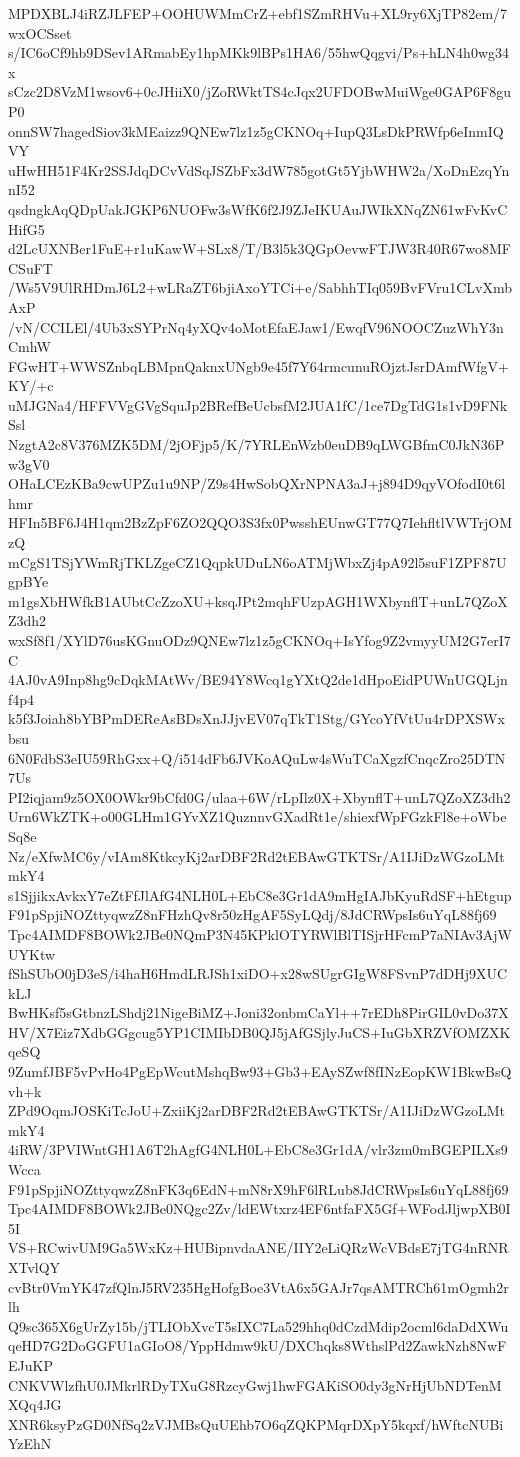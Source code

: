 MPDXBLJ4iRZJLFEP+OOHUWMmCrZ+ebf1SZmRHVu+XL9ry6XjTP82em/7wxOCSset
s/IC6oCf9hb9DSev1ARmabEy1hpMKk9lBPs1HA6/55hwQqgvi/Ps+hLN4h0wg34x
sCzc2D8VzM1wsov6+0cJHiiX0/jZoRWktTS4cJqx2UFDOBwMuiWge0GAP6F8guP0
onnSW7hagedSiov3kMEaizz9QNEw7lz1z5gCKNOq+IupQ3LsDkPRWfp6eInmIQVY
uHwHH51F4Kr2SSJdqDCvVdSqJSZbFx3dW785gotGt5YjbWHW2a/XoDnEzqYnnI52
qsdngkAqQDpUakJGKP6NUOFw3sWfK6f2J9ZJeIKUAuJWIkXNqZN61wFvKvCHifG5
d2LcUXNBer1FuE+r1uKawW+SLx8/T/B3l5k3QGpOevwFTJW3R40R67wo8MFCSuFT
/Ws5V9UlRHDmJ6L2+wLRaZT6bjiAxoYTCi+e/SabhhTIq059BvFVru1CLvXmbAxP
/vN/CCILEl/4Ub3xSYPrNq4yXQv4oMotEfaEJaw1/EwqfV96NOOCZuzWhY3nCmhW
FGwHT+WWSZnbqLBMpnQaknxUNgb9e45f7Y64rmcunuROjztJsrDAmfWfgV+KY/+c
uMJGNa4/HFFVVgGVgSquJp2BRefBeUcbsfM2JUA1fC/1ce7DgTdG1s1vD9FNkSsl
NzgtA2c8V376MZK5DM/2jOFjp5/K/7YRLEnWzb0euDB9qLWGBfmC0JkN36Pw3gV0
OHaLCEzKBa9cwUPZu1u9NP/Z9s4HwSobQXrNPNA3aJ+j894D9qyVOfodI0t6lhmr
HFIn5BF6J4H1qm2BzZpF6ZO2QQO3S3fx0PwsshEUnwGT77Q7IehfltlVWTrjOMzQ
mCgS1TSjYWmRjTKLZgeCZ1QqpkUDuLN6oATMjWbxZj4pA92l5suF1ZPF87UgpBYe
m1gsXbHWfkB1AUbtCcZzoXU+ksqJPt2mqhFUzpAGH1WXbynflT+unL7QZoXZ3dh2
wxSf8f1/XYlD76usKGnuODz9QNEw7lz1z5gCKNOq+IsYfog9Z2vmyyUM2G7erI7C
4AJ0vA9Inp8hg9cDqkMAtWv/BE94Y8Wcq1gYXtQ2de1dHpoEidPUWnUGQLjnf4p4
k5f3Joiah8bYBPmDEReAsBDsXnJJjvEV07qTkT1Stg/GYcoYfVtUu4rDPXSWxbsu
6N0FdbS3eIU59RhGxx+Q/i514dFb6JVKoAQuLw4sWuTCaXgzfCnqcZro25DTN7Us
PI2iqjam9z5OX0OWkr9bCfd0G/ulaa+6W/rLpIlz0X+XbynflT+unL7QZoXZ3dh2
Urn6WkZTK+o00GLHm1GYvXZ1QuznnvGXadRt1e/shiexfWpFGzkFl8e+oWbeSq8e
Nz/eXfwMC6y/vIAm8KtkcyKj2arDBF2Rd2tEBAwGTKTSr/A1IJiDzWGzoLMtmkY4
s1SjjikxAvkxY7eZtFfJlAfG4NLH0L+EbC8e3Gr1dA9mHgIAJbKyuRdSF+hEtgup
F91pSpjiNOZttyqwzZ8nFHzhQv8r50zHgAF5SyLQdj/8JdCRWpsIs6uYqL88fj69
Tpc4AIMDF8BOWk2JBe0NQmP3N45KPklOTYRWlBlTISjrHFcmP7aNIAv3AjWUYKtw
fShSUbO0jD3eS/i4haH6HmdLRJSh1xiDO+x28wSUgrGIgW8FSvnP7dDHj9XUCkLJ
BwHKsf5sGtbnzLShdj21NigeBiMZ+Joni32onbmCaYl++7rEDh8PirGIL0vDo37X
HV/X7Eiz7XdbGGgcug5YP1CIMIbDB0QJ5jAfGSjlyJuCS+IuGbXRZVfOMZXKqeSQ
9ZumfJBF5vPvHo4PgEpWcutMshqBw93+Gb3+EAySZwf8fINzEopKW1BkwBsQvh+k
ZPd9OqmJOSKiTcJoU+ZxiiKj2arDBF2Rd2tEBAwGTKTSr/A1IJiDzWGzoLMtmkY4
4iRW/3PVIWntGH1A6T2hAgfG4NLH0L+EbC8e3Gr1dA/vlr3zm0mBGEPILXs9Wcca
F91pSpjiNOZttyqwzZ8nFK3q6EdN+mN8rX9hF6lRLub8JdCRWpsIs6uYqL88fj69
Tpc4AIMDF8BOWk2JBe0NQgc2Zv/ldEWtxrz4EF6ntfaFX5Gf+WFodJljwpXB0I5I
VS+RCwivUM9Ga5WxKz+HUBipnvdaANE/IIY2eLiQRzWcVBdsE7jTG4nRNRXTvlQY
cvBtr0VmYK47zfQlnJ5RV235HgHofgBoe3VtA6x5GAJr7qsAMTRCh61mOgmh2rlh
Q9sc365X6gUrZy15b/jTLIObXvcT5sIXC7La529hhq0dCzdMdip2ocml6daDdXWu
qeHD7G2DoGGFU1aGIoO8/YppHdmw9kU/DXChqks8WthslPd2ZawkNzh8NwFEJuKP
CNKVWlzfhU0JMkrlRDyTXuG8RzcyGwj1hwFGAKiSO0dy3gNrHjUbNDTenMXQq4JG
XNR6ksyPzGD0NfSq2zVJMBsQuUEhb7O6qZQKPMqrDXpY5kqxf/hWftcNUBiYzEhN
